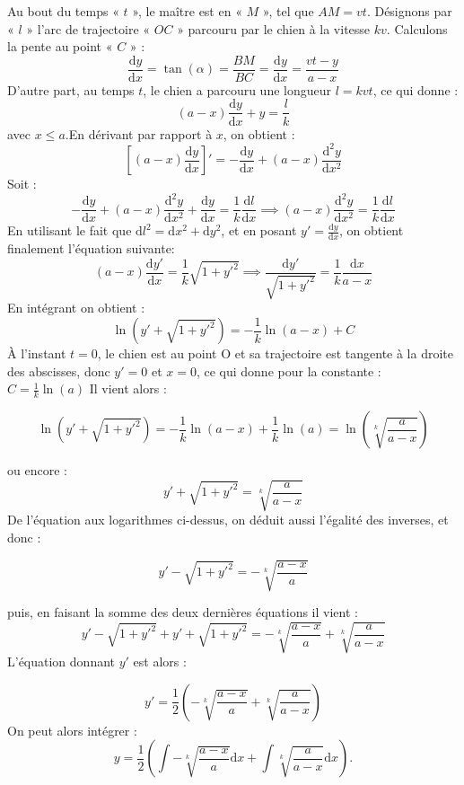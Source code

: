 \begin{Answer}
  Au bout du temps « $t$ », le maître est en  « $M$ », tel que $AM = vt$.
  Désignons par « $l$ » l'arc de trajectoire « $OC$ » parcouru par le chien à la vitesse $kv$. Calculons la pente au point « $C$ »  :
\[\frac{{\mathrm d} y}{{\mathrm d} x} = \tan(\alpha)= \frac{BM}{BC} =\frac{{\mathrm d} y}{{\mathrm d} x} = \frac{vt-y}{a-x} \]
D'autre part, au temps $t$, le chien a parcouru une longueur $l = kvt$, ce qui donne :
\[(a-x)\frac{{\mathrm d} y}{{\mathrm d} x} +y = \frac{l}{k} \]
avec $x \leqslant a.$En dérivant par rapport à $x$, on obtient :
\[\left[(a-x)\frac{{\mathrm d} y}{{\mathrm d} x}\right]' = -\frac{{\mathrm d} y}{{\mathrm d} x} + (a-x)\frac{{\mathrm d^2} y}{{\mathrm d} x^2}\]
Soit :
\[-\frac{{\mathrm d} y}{{\mathrm d} x} + (a-x)\frac{{\mathrm d^2} y}{{\mathrm d} x^2} +  \frac{{\mathrm d} y}{{\mathrm d} x} = \frac{1}{k} \frac{{\mathrm d} l}{{\mathrm d} x} \implies
(a-x)\frac{{\mathrm d^2} y}{{\mathrm d} x^2} = \frac{1}{k} \frac{{\mathrm d} l}{{\mathrm d} x}\]
En utilisant le fait que ${\mathrm d} l^2 = {\mathrm d} x^2+{\mathrm d} y^2 $, et en posant $y'=\frac{{\mathrm d} y}{{\mathrm d} x} $, on obtient finalement  l'équation suivante:
\[(a-x)\frac{{\mathrm d} y'}{{\mathrm d} x} = \frac{1}{k}\sqrt{1+y'^2}
\implies \frac{{\mathrm d} y'}{\sqrt{1+y'^2}} = \frac{1}{k}\frac{{\mathrm d} x}{a-x} \]
En intégrant on obtient :
\[\ln (y'+ \sqrt{1+y'^2}) = - \frac{1}{k}\ln(a-x)+C \]
À l'instant $t=0$, le chien est au point O et sa trajectoire est tangente à la droite des abscisses, donc $y'=0$ et $x=0$, ce qui donne pour la constante : $ C =  \frac{1}{k}\ln(a)$
Il vient alors :

\[\ln (y'+ \sqrt{1+y'^2}) = - \frac{1}{k}\ln(a-x) + \frac{1}{k}\ln(a) = \ln\left(\sqrt[k]{\frac{a}{a-x}}\right) \]

ou encore :
\[y'+ \sqrt{1+y'^2} = \sqrt[k]{\frac{a}{a-x}}\]
De l'équation aux logarithmes ci-dessus, on déduit aussi l’égalité des inverses, et donc :

\[y' - \sqrt{1+y'^2} = -\sqrt[k]{\frac{a-x}{a}}\]

puis, en faisant la somme des deux dernières équations il vient :
\[y'- \sqrt{1+y'^2} + y'+\sqrt{1+y'^2} = -\sqrt[k]{\frac{a-x}{a}} + \sqrt[k]{\frac{a}{a-x}}\]
L'équation donnant $y'$ est alors :

\[y' = \frac{1}{2} (-\sqrt[k]{\frac{a-x}{a}}+\sqrt[k]{\frac{a}{a-x}})\]
On peut alors intégrer :
\[ y = \frac{1}{2} \left(\int{-\sqrt[k]{\frac{a-x}{a}}}{\mathrm d} x + \int{\sqrt[k]{\frac{a}{a-x}}} {\mathrm d} x\right).\]


\end{Answer}
